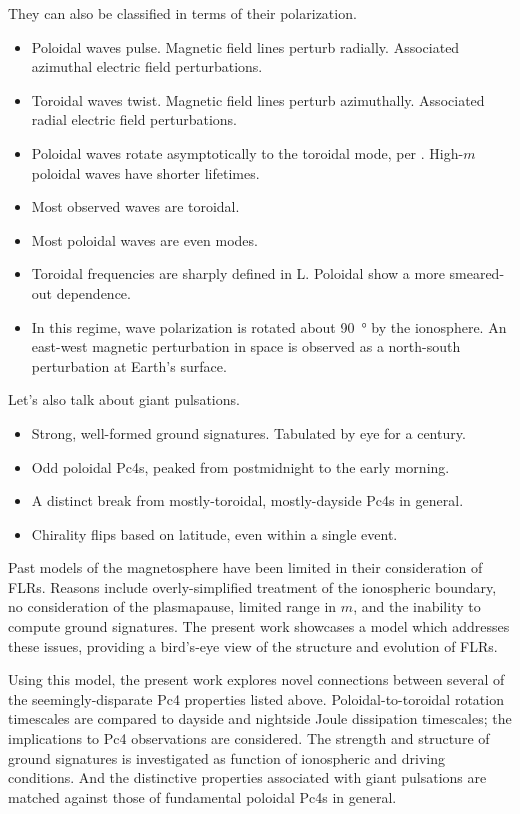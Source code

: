 \documentclass{article}
\newcommand{\azm}{\ensuremath{m}\xspace}
\begin{document}
They can also be classified in terms of their polarization. 

\begin{itemize}
    \item Poloidal waves pulse. Magnetic field lines perturb radially. Associated azimuthal electric field perturbations. 
    \item Toroidal waves twist. Magnetic field lines perturb azimuthally. Associated radial electric field perturbations. 
    \item Poloidal waves rotate asymptotically to the toroidal mode, per \cite{mann_1995}. High-\azm poloidal waves have shorter lifetimes. 
    \item Most observed waves are toroidal. 
    \item Most poloidal waves are even modes. 
    \item Toroidal frequencies are sharply defined in L. Poloidal show a more smeared-out dependence. \cite{engebretson_1986}
    \item In this regime, wave polarization is rotated about \SI{90}{\degree} by the ionosphere\cite{}. An east-west magnetic perturbation in space is observed as a north-south perturbation at Earth's surface. 
\end{itemize}

Let's also talk about giant pulsations. 

\begin{itemize}
    \item Strong, well-formed ground signatures. Tabulated by eye for a century. 
    \item Odd poloidal Pc4s, peaked from postmidnight to the early morning. 
    \item A distinct break from mostly-toroidal, mostly-dayside Pc4s in general. 
    \item Chirality flips based on latitude, even within a single event. 
\end{itemize}

Past models of the magnetosphere have been limited in their
consideration of FLRs. Reasons include overly-simplified treatment of
the ionospheric boundary, no consideration of the plasmapause, limited
range in \azm, and the inability to compute ground signatures. The
present work showcases a model which addresses these issues, providing a
bird’s-eye view of the structure and evolution of FLRs. 

Using this model, the present work explores novel connections between
several of the seemingly-disparate Pc4 properties listed above.
Poloidal-to-toroidal rotation timescales are compared to dayside and
nightside Joule dissipation timescales; the implications to Pc4
observations are considered. The strength and structure of ground
signatures is investigated as function of ionospheric and driving
conditions. And the distinctive properties associated with giant
pulsations are matched against those of fundamental poloidal Pc4s in
general. 
\end{document}
